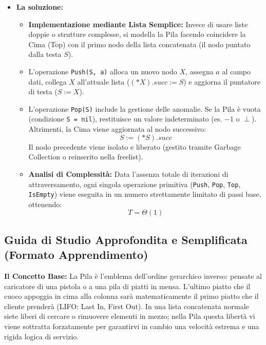 \documentclass[a4paper, 11pt]{report}
\begin{document}
\begin{itemize}
    \item \textbf{La soluzione:}
    \begin{itemize}
        \item \textbf{Implementazione mediante Lista Semplice:} Invece di usare liste doppie o strutture complesse, si modella la Pila facendo coincidere la Cima (Top) con il primo nodo della lista concatenata (il nodo puntato dalla testa $S$).
        \item L'operazione \texttt{Push(S, a)} alloca un nuovo nodo $X$, assegna $a$ al campo dati, collega $X$ all'attuale lista ($(*X).succ := S$) e aggiorna il puntatore di testa ($S := X$).
        \item L'operazione \texttt{Pop(S)} include la gestione delle anomalie. Se la Pila è vuota (condizione \texttt{S = nil}), restituisce un valore indeterminato (es. $-1$ o $\perp$). Altrimenti, la Cima viene aggiornata al nodo successivo:
        \begin{equation*}
        S := (*S).succ
        \end{equation*}
        Il nodo precedente viene isolato e liberato (gestito tramite Garbage Collection o reinserito nella freelist).
        \item \textbf{Analisi di Complessità:} Data l'assenza totale di iterazioni di attraversamento, ogni singola operazione primitiva (\texttt{Push}, \texttt{Pop}, \texttt{Top}, \texttt{IsEmpty}) viene eseguita in un numero strettamente limitato di passi base, ottenendo:
        \[ T = \Theta(1) \]
    \end{itemize}
\end{itemize}

\vspace{0.5cm}
\subsection*{Guida di Studio Approfondita e Semplificata (Formato Apprendimento)}



\textbf{Il Concetto Base:}
La Pila è l'emblema dell'ordine gerarchico inverso: pensate al caricatore di una pistola o a una pila di piatti in mensa. L'ultimo piatto che il cuoco appoggia in cima alla colonna sarà matematicamente il primo piatto che il cliente prenderà (LIFO: Last In, First Out). In una lista concatenata normale siete liberi di cercare o rimuovere elementi in mezzo; nella Pila questa libertà vi viene sottratta forzatamente per garantirvi in cambio una velocità estrema e una rigida logica di servizio.
\end{document}
